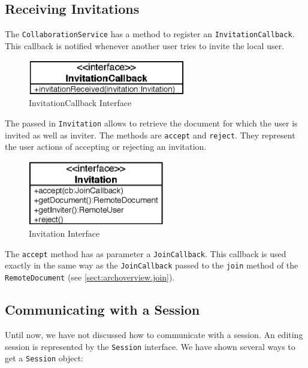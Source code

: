 \subsection{Receiving Invitations}
\label{sect:archoverview.invitation}
The \texttt{CollaborationService} has a method to register an
\texttt{InvitationCallback}. This callback is notified whenever another user
tries to invite the local user. 

\begin{figure}[H]
 \centering
 \includegraphics[width=6.84cm,height=1.52cm]{../images/finalreport/architecture_invitationcallback_uml.eps}
 \caption{InvitationCallback Interface}
\end{figure}

The passed in \texttt{Invitation} allows to retrieve the document for which
the user is invited as well as inviter. The
methods are \texttt{accept} and \texttt{reject}. They represent
the user actions of accepting or rejecting an invitation. 

\begin{figure}[H]
 \centering
 \includegraphics[width=5.96cm,height=2.82cm]{../images/finalreport/architecture_invitation_uml.eps}
 \caption{Invitation Interface}
\end{figure}

The \texttt{accept} method has as parameter a \texttt{Join\-Callback}. This
callback is used exactly in the same way as the \texttt{Join\-Callback} passed
to the \texttt{join} method of the \texttt{Remote\-Document} 
(see \ref{sect:archoverview.join}).


\subsection{Communicating with a Session}
Until now, we have not discussed how to communicate with a session. An
editing session is represented by the \texttt{Session} interface.
We have shown several ways to get a \texttt{Session} object:

